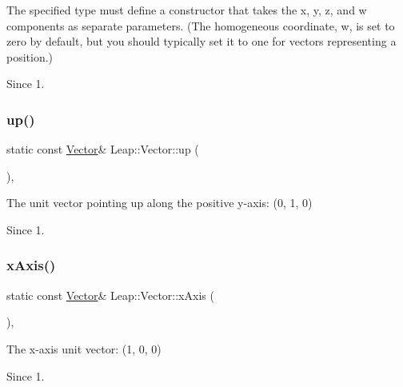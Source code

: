 The specified type must define a constructor that takes the x, y, z, and w components as separate parameters. (The homogeneous coordinate, w, is set to zero by default, but you should typically set it to one for vectors representing a position.) \begin{DoxySince}{Since}
1. 
\end{DoxySince}
\mbox{\label{struct_leap_1_1_vector_a0a38a683c0224b38b75d58db24f51adf}} 
\subsubsection{\texorpdfstring{up()}{up()}}
{\footnotesize\ttfamily static const \hyperlink{struct_leap_1_1_vector}{Vector}\& Leap\+::\+Vector\+::up (\begin{DoxyParamCaption}{ }\end{DoxyParamCaption})\hspace{0.3cm}{\ttfamily [inline]}, {\ttfamily [static]}}

The unit vector pointing up along the positive y-\/axis\+: (0, 1, 0)


\begin{DoxyCodeInclude}
\end{DoxyCodeInclude}
 \begin{DoxySince}{Since}
1. 
\end{DoxySince}
\mbox{\label{struct_leap_1_1_vector_a0d90c96672e7ee90fb510d7b96c32861}} 
\subsubsection{\texorpdfstring{x\+Axis()}{xAxis()}}
{\footnotesize\ttfamily static const \hyperlink{struct_leap_1_1_vector}{Vector}\& Leap\+::\+Vector\+::x\+Axis (\begin{DoxyParamCaption}{ }\end{DoxyParamCaption})\hspace{0.3cm}{\ttfamily [inline]}, {\ttfamily [static]}}

The x-\/axis unit vector\+: (1, 0, 0)


\begin{DoxyCodeInclude}
\end{DoxyCodeInclude}
 \begin{DoxySince}{Since}
1. 
\end{DoxySince}
\mbox{\label{struct_leap_1_1_vector_a42ebba3b0dc3d7f3e5eacf4a0cc39a6d}} 
